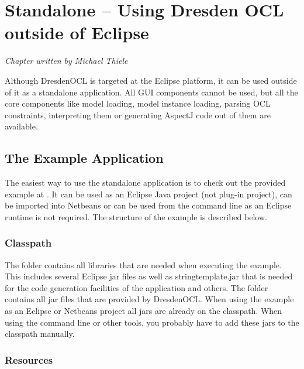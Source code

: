 \chapter{Standalone -- Using Dresden OCL outside of Eclipse}
\label{chapter:standalone}
\lstset{language=Java}

\begin{flushright}
\textit{Chapter written by Michael Thiele}
\end{flushright}

Although DresdenOCL is targeted at the Eclipse platform, it can be used outside
of it as a standalone application. All GUI components cannot be used, but all 
the core components like model loading, model instance loading, parsing OCL 
constraints, interpreting them or generating AspectJ code out of them are 
available.


\section{The Example Application}

The easiest way to use the standalone application is to check out the provided 
example at 
.
It can be used as an Eclipse Java project (not plug-in project), can be imported
into Netbeans or can be used from the command line as an Eclipse runtime is not 
required. The structure of the example is described below.


\subsection{Classpath}

The  folder contains all libraries that are needed when executing
the example. This includes several Eclipse jar files as well as
stringtemplate.jar that is needed for the code generation facilities of the 
application and others. The  folder contains all jar files
that are provided by DresdenOCL. When using the example as an Eclipse or
Netbeans project all jars are already on the classpath. When using the command
line or other tools, you probably have to add these jars to the classpath manually.


\subsection{Resources}

